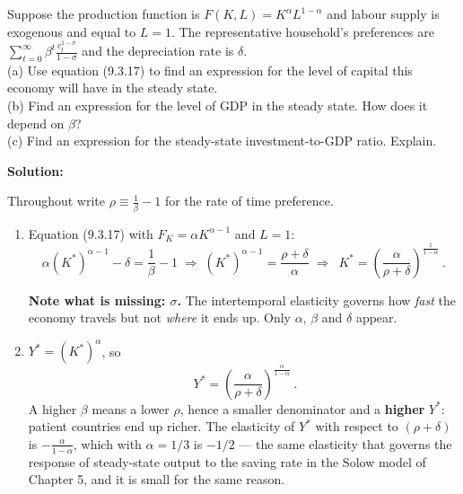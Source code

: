 \documentclass[12pt, letterpaper]{article}
\newcommand{\stst}{^{\ast}}
\begin{document}
\begin{tcolorbox}[oddbox,title={Problem 9.11 \quad Patience and Investment}]
\begin{tcolorbox}[questionbox]
Suppose the production function is $F(K,L)=K^{\alpha}L^{1-\alpha}$ and labour supply is exogenous
and equal to $L=1$. The representative household's preferences are
$\sum_{t=0}^{\infty}\beta^t\frac{c_t^{1-\sigma}}{1-\sigma}$ and the depreciation rate is
$\delta$.\\[3pt]
(a) Use equation (9.3.17) to find an expression for the level of capital this economy will have
in the steady state.\\
(b) Find an expression for the level of GDP in the steady state. How does it depend on
$\beta$?\\
(c) Find an expression for the steady-state investment-to-GDP ratio. Explain.
\end{tcolorbox}

\textbf{Solution:}

Throughout write $\rho\equiv\frac{1}{\beta}-1$ for the rate of time preference.

\begin{enumerate}
\item Equation (9.3.17) with $F_K=\alpha K^{\alpha-1}$ and $L=1$:
\[
\alpha (K\stst)^{\alpha-1}-\delta=\frac{1}{\beta}-1
\;\Longrightarrow\;
(K\stst)^{\alpha-1}=\frac{\rho+\delta}{\alpha}
\;\Longrightarrow\;
\boxed{\ K\stst=\left(\frac{\alpha}{\rho+\delta}\right)^{\frac{1}{1-\alpha}}\ }.
\]

\textbf{Note what is missing: $\sigma$.} The intertemporal elasticity governs how \emph{fast}
the economy travels but not \emph{where} it ends up. Only $\alpha$, $\beta$ and $\delta$ appear.

\item $Y\stst=(K\stst)^{\alpha}$, so
\[
\boxed{\ Y\stst=\left(\frac{\alpha}{\rho+\delta}\right)^{\frac{\alpha}{1-\alpha}}\ }.
\]
A higher $\beta$ means a lower $\rho$, hence a smaller denominator and a \textbf{higher}
$Y\stst$: patient countries end up richer. The elasticity of $Y\stst$ with respect to
$(\rho+\delta)$ is $-\frac{\alpha}{1-\alpha}$, which with $\alpha=1/3$ is $-1/2$ --- the same
elasticity that governs the response of steady-state output to the saving rate in the Solow
model of Chapter 5, and it is small for the same reason.


\end{enumerate}
\end{tcolorbox}
\end{document}
